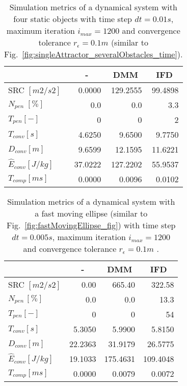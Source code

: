 \begin{table}[h]
\centering
\caption{Simulation metrics of a dynamical system with four static objects  with time step $dt = 0.01 s$, maximum iteration $i_{max} = 1200$ and convergence tolerance $r_\epsilon = 0.1 m$ (similar to Fig.~\ref{fig:singleAttractor_severalObstacles_time}).}
\label{tab:fourStaticObjects}
\begin{tabular}{|l|r|r|r|} \hline
 &\multicolumn{1}{c|}{-} &\multicolumn{1}{c|}{DMM} &\multicolumn{1}{c|}{IFD} \\ \hline
SRC $[m2/s2]$ &0.0000 &129.2555 &99.4898 \\ \hline
$N_{pen} \; [\%]$ &0.0 &0.0 &3.3 \\ \hline
$T_{pen} [-] $ &0 &0 &2 \\ \hline
$T_{conv} [s]$ &4.6250 &9.6500 &9.7750 \\ \hline
$D_{conv} [m]$ &9.6599 &12.1595 &11.6221 \\ \hline
$\hat E_{conv} [J/kg]$ &37.0222 &127.2202 &55.9537 \\ \hline
$T_{comp} [ms]$ &0.0000 &0.0096 &0.0102 \\ \hline
\end{tabular}
\end{table}



\begin{table}[h]
\centering
\caption{Simulation metrics of a dynamical system with a fast moving ellipse (similar to Fig.~\ref{fig:fastMovingEllipse_fig}) with time step $dt = 0.005 s$, maximum iteration $i_{max} = 1200$ and convergence tolerance $r_\epsilon = 0.1 m$ .}
\label{tab:fastMovingEllipse}
\begin{tabular}{|l|r|r|r|} \hline
 &\multicolumn{1}{c|}{-} &\multicolumn{1}{c|}{DMM} &\multicolumn{1}{c|}{IFD} \\ \hline
SRC $[m2/s2]$ &0.00 &665.40 &322.58 \\ \hline
$N_{pen} \, [\%]$ &0.0 &0.0 &13.3\\ \hline
$T_{pen} [-]$ &0 &0 &54 \\ \hline
$T_{conv} [s]$ &5.3050 &5.9900 &5.8150 \\ \hline
$D_{conv} [m]$ &22.2363 &31.9179 &26.5775 \\ \hline
$\hat E_{conv} [J/kg]$ &19.1033 &175.4631 &109.4048 \\ \hline
$T_{comp} [ms]$ &0.0000 &0.0079 &0.0072 \\ \hline
\end{tabular}
\end{table}

